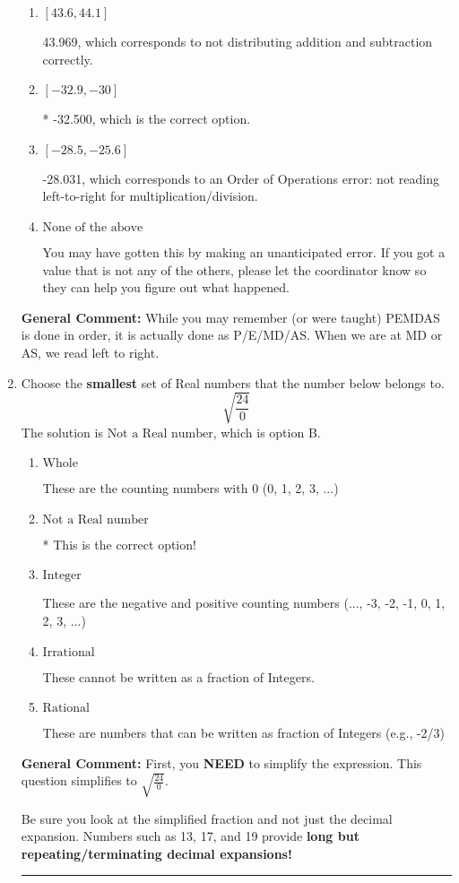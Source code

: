\documentclass{extbook}[14pt]
\newcommand{\litem}[1]{\item #1

\rule{\textwidth}{0.4pt}}
\begin{document}
\begin{enumerate}
{\begin{enumerate}[label=\Alph*.]
 -29.000, which corresponds to not distributing a negative correctly.
\item \( [43.6, 44.1] \)

 43.969, which corresponds to not distributing addition and subtraction correctly.
\item \( [-32.9, -30] \)

* -32.500, which is the correct option.
\item \( [-28.5, -25.6] \)

 -28.031, which corresponds to an Order of Operations error: not reading left-to-right for multiplication/division.
\item \( \text{None of the above} \)

 You may have gotten this by making an unanticipated error. If you got a value that is not any of the others, please let the coordinator know so they can help you figure out what happened.
\end{enumerate}

\textbf{General Comment:} While you may remember (or were taught) PEMDAS is done in order, it is actually done as P/E/MD/AS. When we are at MD or AS, we read left to right.
}
\litem{
Choose the \textbf{smallest} set of Real numbers that the number below belongs to.
\[ \sqrt{\frac{24}{0}} \]The solution is \( \text{Not a Real number} \), which is option B.\begin{enumerate}[label=\Alph*.]
\item \( \text{Whole} \)

These are the counting numbers with 0 (0, 1, 2, 3, ...)
\item \( \text{Not a Real number} \)

* This is the correct option!
\item \( \text{Integer} \)

These are the negative and positive counting numbers (..., -3, -2, -1, 0, 1, 2, 3, ...)
\item \( \text{Irrational} \)

These cannot be written as a fraction of Integers.
\item \( \text{Rational} \)

These are numbers that can be written as fraction of Integers (e.g., -2/3)
\end{enumerate}

\textbf{General Comment:} First, you \textbf{NEED} to simplify the expression. This question simplifies to $\sqrt{\frac{24}{0}}$. 
 
 Be sure you look at the simplified fraction and not just the decimal expansion. Numbers such as 13, 17, and 19 provide \textbf{long but repeating/terminating decimal expansions!} 
 
}
\end{enumerate}
\end{document}
